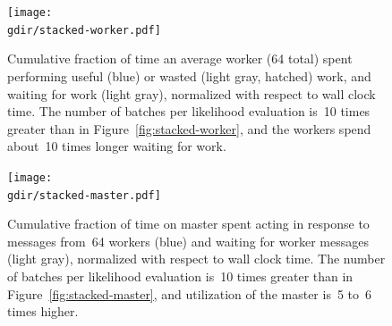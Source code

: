 \documentclass[angelino.tex]{subfiles}
\newcommand{\gdir}{figs/20140310}
\begin{document}
\begin{figure}[t!]
\begin{center}
\texttt{[image: \\gdir/stacked-worker.pdf]}
\end{center}
\vspace{-0.1in}
\caption{Cumulative fraction of time an average worker (64 total) spent performing
useful (blue) or wasted (light gray, hatched) work, and waiting for work
(light gray), normalized with respect to wall clock time.
The number of batches per likelihood evaluation is~10 times greater than in
Figure~\ref{fig:stacked-worker},
and the workers spend about~10 times longer waiting for work.
}
\label{fig:stacked-worker-wait}
\end{figure}
%
\begin{figure}[t!]
\begin{center}
\texttt{[image: \\gdir/stacked-master.pdf]}
\end{center}
\vspace{-0.1in}
\caption{Cumulative fraction of time on master spent acting in response to
messages from~64 workers (blue) and waiting for worker messages (light gray),
normalized with respect to wall clock time.
The number of batches per likelihood evaluation is~10 times greater than in
Figure~\ref{fig:stacked-master},
and utilization of the master is~5 to~6 times higher.}
\label{fig:stacked-master-work}
\end{figure}
\end{document}
